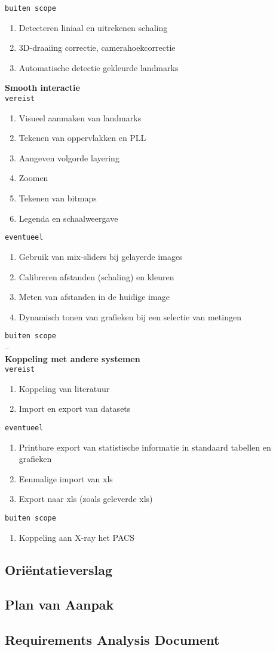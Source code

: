 \verb!buiten scope!
\begin{enumerate}
	\item Detecteren liniaal en uitrekenen schaling
	\item 3D-draaiing correctie, camerahoekcorrectie
	\item Automatische detectie gekleurde landmarks\\
\end{enumerate}
\Large{\textbf{Smooth interactie}}
\\\verb!vereist!
\begin{enumerate}
	\item Visueel aanmaken van landmarks
	\item Tekenen van oppervlakken en PLL
	\item Aangeven volgorde layering
	\item Zoomen
	\item Tekenen van bitmaps
	\item Legenda en schaalweergave
\end{enumerate}
\verb!eventueel!
\begin{enumerate}
	\item Gebruik van mix-sliders bij gelayerde images
	\item Calibreren afstanden (schaling) en kleuren
	\item Meten van afstanden in de huidige image
	\item Dynamisch tonen van grafieken bij een selectie van metingen
\end{enumerate}
\verb!buiten scope!\\
--\\
\Large{\textbf{Koppeling met andere systemen}}
\\\verb!vereist!
\begin{enumerate}
	\item Koppeling van literatuur
	\item Import en export van datasets
\end{enumerate}
\verb!eventueel!
\begin{enumerate}
	\item Printbare export van statistische informatie in standaard tabellen en grafieken
	\item Eenmalige import van xls
	\item Export naar xls (zoals geleverde xls)
\end{enumerate}
\verb!buiten scope!
\begin{enumerate}
	\item Koppeling aan X-ray het PACS
\end{enumerate}

\subsection{Ori\"{e}ntatieverslag}
\label{Orientatieverslag}

\subsection{Plan van Aanpak}
\label{PvA}

\subsection{Requirements Analysis Document}
\label{RAD}
